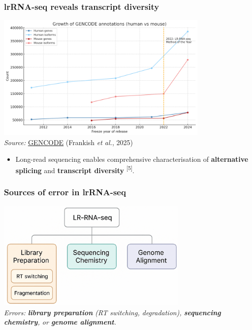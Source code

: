 \documentclass[aspectratio=169]{beamer}
\begin{document}
\begin{frame}
  \frametitle{lrRNA-seq reveals transcript diversity}
  \centering
  \includegraphics[width=0.78\textwidth]{Growth of GENCODE annotations (human vs mouse).png}\\
  \vspace{0.2em}
  {\scriptsize\emph{Source:} \href{https://www.gencodegenes.org/}{GENCODE} (Frankish \emph{et al.}, 2025)}
  \vspace{0.4em}
  \begin{itemize}
    \item Long-read sequencing enables comprehensive characterisation of \textbf{alternative splicing} and \textbf{transcript diversity} \textsuperscript{[5]}.
  \end{itemize}
\end{frame}

\begin{frame}
  \frametitle{Sources of error in lrRNA-seq}
  \centering
  \includegraphics[width=0.7\textwidth]{lr-rna-seq_errors.png}\\
  \vspace{0.2em}
  {\scriptsize\emph{Errors: \textbf{library preparation} (RT switching, degradation), \textbf{sequencing chemistry}, or \textbf{genome alignment}.}}
\end{frame}
\end{document}
